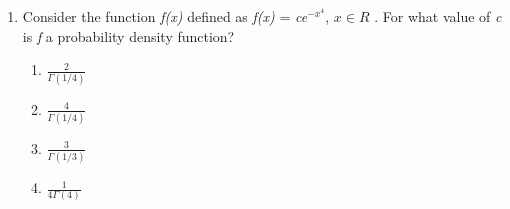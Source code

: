 \begin{enumerate}[label=\thesection.\arabic*.,ref=\thesection.\theenumi]
\begin{enumerate}
\end{enumerate}
%
\solution

%
\item Consider the function \textit{f(x)} defined as \textit{f(x)} = \textit{ce$^{-x^{4}}$}, $\textit{x} \in R$ . For what value of \textit{c} is \textit{f} a probability density function?\\
\begin{enumerate}
    \item $\displaystyle\frac{2}{\Gamma(1/4)}$\\\label{2019/52/option 1}
    \item $\displaystyle\frac{4}{\Gamma(1/4)}$\\
    \item $\displaystyle\frac{3}{\Gamma(1/3)}$\\
    \item $\displaystyle\frac{1}{4\Gamma(4)}$
\end{enumerate}
%
\solution


\end{enumerate}


